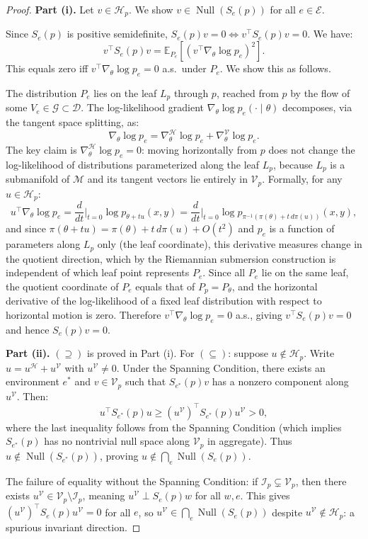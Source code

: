 \documentclass[11pt,a4paper]{article}
\DeclareMathOperator{\Null}{Null}
\newcommand{\cM}{\mathcal{M}}
\newcommand{\cG}{\mathcal{G}}
\newcommand{\cH}{\mathcal{H}}
\newcommand{\cV}{\mathcal{V}}
\newcommand{\cD}{\mathcal{D}}
\newcommand{\cE}{\mathcal{E}}
\newcommand{\EE}{\mathbb{E}}
\begin{document}
\begin{proof}
\textbf{Part (i).} Let $v \in \cH_p$. We show $v \in \Null(S_e(p))$ for all $e \in \cE$.

Since $S_e(p)$ is positive semidefinite, $S_e(p)v = 0 \iff v^\top S_e(p) v = 0$. We have:
\[
v^\top S_e(p) v = \EE_{P_e}\!\left[(v^\top \nabla_\theta \log p_e)^2\right].
\]
This equals zero iff $v^\top \nabla_\theta \log p_e = 0$ a.s.\ under $P_e$. We show this as follows.

The distribution $P_e$ lies on the leaf $L_p$ through $p$, reached from $p$ by the flow of some $V_e \in \cG \subset \cD$. The log-likelihood gradient $\nabla_\theta \log p_e(\cdot \mid \theta)$ decomposes, via the tangent space splitting, as:
\[
\nabla_\theta \log p_e = \nabla_\theta^{\cH} \log p_e + \nabla_\theta^{\cV} \log p_e.
\]
The key claim is $\nabla_\theta^{\cH} \log p_e = 0$: moving horizontally from $p$ does not change the log-likelihood of distributions parameterized along the leaf $L_p$, because $L_p$ is a submanifold of $\cM$ and its tangent vectors lie entirely in $\cV_p$. Formally, for any $u \in \cH_p$:
\[
u^\top \nabla_\theta \log p_e = \frac{d}{dt}\bigg|_{t=0} \log p_{\theta + tu}(x, y) = \frac{d}{dt}\bigg|_{t=0} \log p_{\pi^{-1}(\pi(\theta) + t\, d\pi(u))}(x, y),
\]
and since $\pi(\theta + tu) = \pi(\theta) + t\, d\pi(u) + O(t^2)$ and $p_e$ is a function of parameters along $L_p$ only (the leaf coordinate), this derivative measures change in the quotient direction, which by the Riemannian submersion construction is independent of which leaf point represents $P_e$. Since all $P_e$ lie on the same leaf, the quotient coordinate of $P_e$ equals that of $P_p = P_\theta$, and the horizontal derivative of the log-likelihood of a fixed leaf distribution with respect to horizontal motion is zero. Therefore $v^\top \nabla_\theta \log p_e = 0$ a.s., giving $v^\top S_e(p) v = 0$ and hence $S_e(p) v = 0$.

\textbf{Part (ii).} $(\supseteq)$ is proved in Part (i). For $(\subseteq)$: suppose $u \notin \cH_p$. Write $u = u^\cH + u^\cV$ with $u^\cV \neq 0$. Under the Spanning Condition, there exists an environment $e^*$ and $v \in \cV_p$ such that $S_{e^*}(p)v$ has a nonzero component along $u^\cV$. Then:
\[
u^\top S_{e^*}(p) u \geq (u^\cV)^\top S_{e^*}(p) u^\cV > 0,
\]
where the last inequality follows from the Spanning Condition (which implies $S_{e^*}(p)$ has no nontrivial null space along $\cV_p$ in aggregate). Thus $u \notin \Null(S_{e^*}(p))$, proving $u \notin \bigcap_e \Null(S_e(p))$.

The failure of equality without the Spanning Condition: if $\mathcal{I}_p \subsetneq \cV_p$, then there exists $u^\cV \in \cV_p \setminus \mathcal{I}_p$, meaning $u^\cV \perp S_e(p)w$ for all $w, e$. This gives $(u^\cV)^\top S_e(p) u^\cV = 0$ for all $e$, so $u^\cV \in \bigcap_e \Null(S_e(p))$ despite $u^\cV \notin \cH_p$: a spurious invariant direction.
\end{proof}
\end{document}
